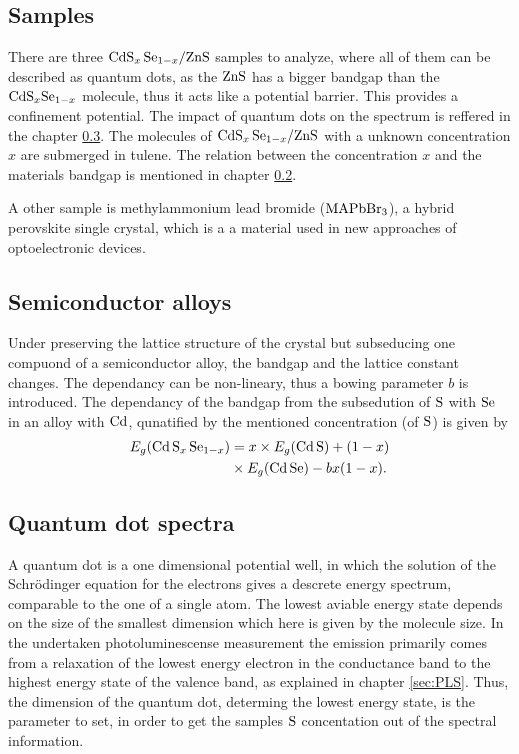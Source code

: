 \subsection{Samples}
\label{sec:samples}

There are three $\ce{CdS_x Se_{1-x}/ZnS}$ samples to analyze, where all of them can be described as quantum dots, as the $\ce{ZnS}$ has a bigger bandgap than the $\ce{CdS_xSe_{1-x}}$ molecule, 
thus it acts like a potential barrier.
This provides a confinement potential. The impact of quantum dots on the spectrum is reffered in the chapter \ref{sec:QD}.
The molecules of $\ce{CdS_x Se_{1-x}/ZnS}$ with a unknown concentration $x$ are submerged in tulene.
The relation between the concentration $x$ and the materials bandgap is mentioned in chapter \ref{sec:SemAll}.

A other sample is methylammonium lead bromide ($\ce{MAPbBr_3}$), a hybrid perovskite single crystal, which is a a material used in new approaches of optoelectronic devices.

\subsection{Semiconductor alloys}
\label{sec:SemAll}

Under preserving the lattice structure of the crystal but subseducing one compuond of a semiconductor alloy, the bandgap and the lattice constant changes.
The dependancy can be non-lineary, thus a bowing parameter $b$ is introduced. 
The dependancy of the bandgap from the subsedution of $\ce{S}$ with $\ce{Se}$ in an alloy with $\ce{Cd}$, qunatified by the mentioned concentration (of $\ce{S}$) is given by
\begin{align*}
    E_g(\ce{Cd S_x Se_{1-x}}) &= x \times E_g(\ce{Cd S}) + (1-x) \\ &\times E_g(\ce{Cd Se}) - bx(1-x).
\end{align*}

\subsection{Quantum dot spectra}
\label{sec:QD}

A quantum dot is a one dimensional potential well, in which the solution of the Schrödinger equation for the electrons gives a descrete energy spectrum, comparable to the one of a single atom.
The lowest aviable energy state depends on the size of the smallest dimension which here is given by the molecule size.
In the undertaken photoluminescense measurement the emission primarily comes from a relaxation of the lowest energy electron in the conductance band to the highest energy state of the valence band, as explained in chapter \ref{sec:PLS}.
Thus, the dimension of the quantum dot, determing the lowest energy state, is the parameter to set, in order to get the samples $\ce{S}$ concentation out of the spectral information.

